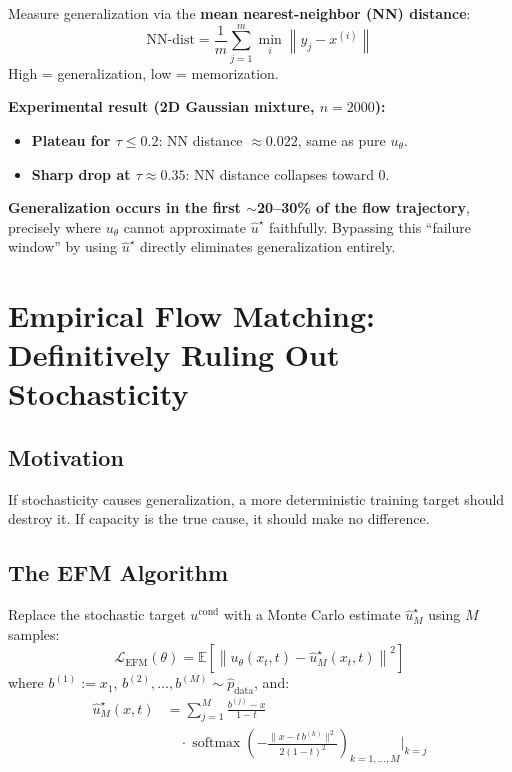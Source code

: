 \documentclass[11pt, a4paper]{article}
\newcommand{\E}{\mathbb{E}}
\newcommand{\norm}[1]{\left\|#1\right\|}
\newcommand{\softmax}{\operatorname{softmax}}
\theoremstyle{plain}
\theoremstyle{definition}
\theoremstyle{remark}
\begin{document}
Measure generalization via the \textbf{mean nearest-neighbor (NN) distance}:
\[
  \mathrm{NN\text{-}dist} = \frac{1}{m}\sum_{j=1}^m \min_i \norm{y_j - x^{(i)}}
\]
High = generalization, low = memorization.

\textbf{Experimental result (2D Gaussian mixture, $n=2000$):}
\begin{itemize}
  \item \textbf{Plateau for $\tau \leq 0.2$}: NN distance $\approx 0.022$, same as pure $u_\theta$.
  \item \textbf{Sharp drop at $\tau \approx 0.35$}: NN distance collapses toward 0.
\end{itemize}

\begin{keybox}
\textbf{Generalization occurs in the first $\sim$20--30\% of the flow trajectory}, precisely where $u_\theta$ cannot approximate $\hat{u}^\star$ faithfully. Bypassing this ``failure window'' by using $\hat{u}^\star$ directly eliminates generalization entirely.
\end{keybox}

\section{Empirical Flow Matching: Definitively Ruling Out Stochasticity}
\label{sec:efm}

\subsection{Motivation}

If stochasticity causes generalization, a more deterministic training target should destroy it. If capacity is the true cause, it should make no difference.

\subsection{The EFM Algorithm}

\begin{thmbox}
Replace the stochastic target $u^{\mathrm{cond}}$ with a Monte Carlo estimate $\hat{u}^\star_M$ using $M$ samples:
\begin{equation}
  \mathcal{L}_{\mathrm{EFM}}(\theta) = \E\!\left[\norm{u_\theta(x_t, t) - \hat{u}^\star_M(x_t, t)}^2\right]
  \label{eq:efm_loss}
\end{equation}
where $b^{(1)} := x_1$, $b^{(2)},\ldots,b^{(M)} \sim \hat{p}_{\mathrm{data}}$, and:
\[
\begin{aligned}
  \hat{u}^\star_M(x, t) &= \sum_{j=1}^M \frac{b^{(j)} - x}{1-t} \\
  &\quad\cdot \softmax\!\left(-\frac{\|x - t\,b^{(k)}\|^2}{2(1-t)^2}\right)_{k=1,\ldots,M}\!\Bigg|_{k=j}
\end{aligned}
\]
\end{thmbox}
\end{document}
